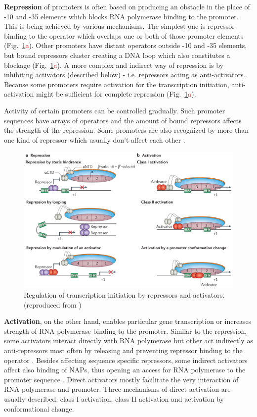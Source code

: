 \textbf{Repression} of promoters is often based on producing an obstacle in the place of -10 and -35 elements which blocks RNA polymerase binding to the promoter.
This is being achieved by various mechanisms.
The simplest one is repressor binding to the operator which overlaps one or both of those promoter elements \cite{brent1981mechanism} (Fig.~\ref{txn}\textcolor{red}{a}).
Other promoters have distant operators outside -10 and -35 elements, but bound repressors cluster creating a DNA loop which also constitutes a blockage \cite{semsey2004dna} (Fig.~\ref{txn}\textcolor{red}{a}).
A more complex and indirect way of repression is by inhibiting activators (described below) - i.e. repressors acting as anti-activators \cite{sogaard1993protein}.
Because some promoters require activation for the transcription initiation, anti-activation might be sufficient for complete repression (Fig.~\ref{txn}\textcolor{red}{a}).

Activity of certain promoters can be controlled gradually.
Such promoter sequences have arrays of operators and the amount of bound repressors affects the strength of the repression.
Some promoters are also recognized by more than one kind of repressor which usually don't affect each other \cite{el2009repression}.

\begin{figure}[ht!]
  \centering
  \includegraphics[scale=0.4]{text/Pictures/TxnInitRegulation.png}
	\caption{Regulation of transcription initiation by repressors and activators. (reproduced from \cite{browning2016local})}
	\label{txn}
\end{figure}

\textbf{Activation}, on the other hand, enables particular gene transcription or increases strength of RNA polymerase binding to the promoter.
Similar to the repression, some activators interact directly with RNA polymerase but other act indirectly as anti-repressors most often by releasing and preventing repressor binding to the operator \cite{frederix2011co}.
Besides affecting sequence specific repressors, some indirect activators affect also binding of NAPs, thus opening an access for RNA polymerase to the promoter sequence \cite{santana2001transcriptional}.
Direct activators mostly facilitate the very interaction of RNA polymerase and promoter.
Three mechanisms of direct activation are usually described: class I activation, class II activation and activation by conformational change.

